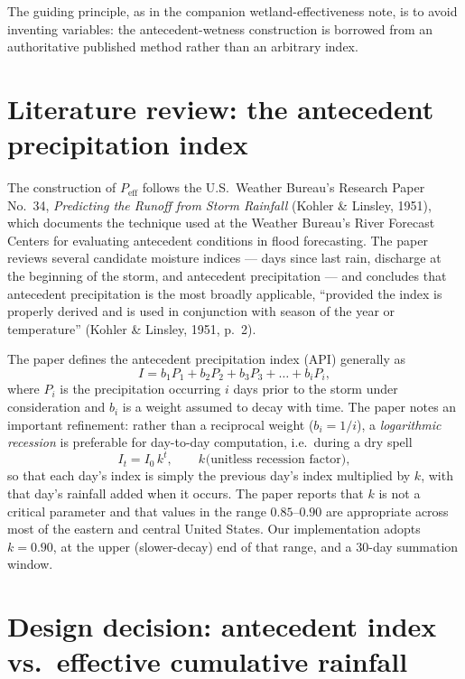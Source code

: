 \documentclass[11pt]{article}
\begin{document}
The guiding principle, as in the companion wetland-effectiveness note, is to avoid inventing
variables: the antecedent-wetness construction is borrowed from an authoritative published
method rather than an arbitrary index.

\section{Literature review: the antecedent precipitation index}

The construction of $P_{\text{eff}}$ follows the U.S.\ Weather Bureau's Research Paper No.\ 34,
\emph{Predicting the Runoff from Storm Rainfall} (Kohler \& Linsley, 1951), which documents the
technique used at the Weather Bureau's River Forecast Centers for evaluating antecedent
conditions in flood forecasting. The paper reviews several candidate moisture indices --- days
since last rain, discharge at the beginning of the storm, and antecedent precipitation --- and
concludes that antecedent precipitation is the most broadly applicable, ``provided the index is
properly derived and is used in conjunction with season of the year or temperature''
(Kohler \& Linsley, 1951, p.\ 2).

The paper defines the antecedent precipitation index (API) generally as
\begin{equation}
  I = b_1 P_1 + b_2 P_2 + b_3 P_3 + \dots + b_i P_i,
  \label{eq:api-general}
\end{equation}
where $P_i$ is the precipitation occurring $i$ days prior to the storm under consideration and
$b_i$ is a weight assumed to decay with time. The paper notes an important refinement: rather
than a reciprocal weight ($b_i = 1/i$), a \emph{logarithmic recession} is preferable for
day-to-day computation, i.e.\ during a dry spell
\begin{equation}
  I_t = I_0\, k^{t}, \qquad k^{}\text{(unitless recession factor)},
  \label{eq:api-recession}
\end{equation}
so that each day's index is simply the previous day's index multiplied by $k$, with that day's
rainfall added when it occurs. The paper reports that $k$ is not a critical parameter and that
values in the range $0.85$--$0.90$ are appropriate across most of the eastern and central United
States. Our implementation adopts $k = 0.90$, at the upper (slower-decay) end of that range, and
a 30-day summation window.

\section{Design decision: antecedent index vs.\ effective cumulative rainfall}
\end{document}
